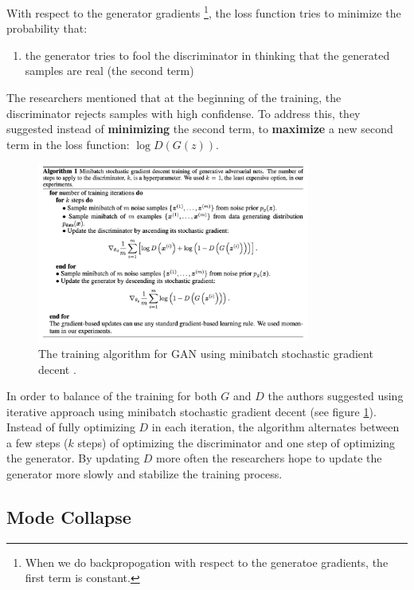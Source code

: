 With respect to the generator gradients \footnote{When we do backpropogation with respect to the generatoe gradients, the first term is constant.}, the loss function tries to minimize the probability that:

\begin{enumerate}
    \item the generator tries to fool the discriminator in thinking that the generated samples are real (the second term)
\end{enumerate}


The researchers mentioned that at the beginning of the training, the discriminator rejects samples with high confidense. To address this, they suggested instead of \textbf{minimizing} the second term, to \textbf{maximize} a new second term in the loss function: $\log D(G(z))$.


\begin{figure}
    \centering
    \includegraphics[width=0.8\textwidth]{images/gan/gan_training.png}
    \caption{The training algorithm for GAN using minibatch stochastic gradient decent \cite{gan}.}
    \label{fig:gan_training}
\end{figure}

In order to balance of the training for both $G$ and $D$ the authors suggested using iterative approach using minibatch stochastic gradient decent (see figure \ref{fig:gan_training}). Instead of fully optimizing $D$ in each iteration, the algorithm alternates between a few steps ($k$ steps) of optimizing the discriminator and one step of optimizing the generator. By updating $D$ more often the researchers hope to update the generator more slowly and stabilize the training process.



\subsection{Mode Collapse}
\label{gan_mode_collapse}

